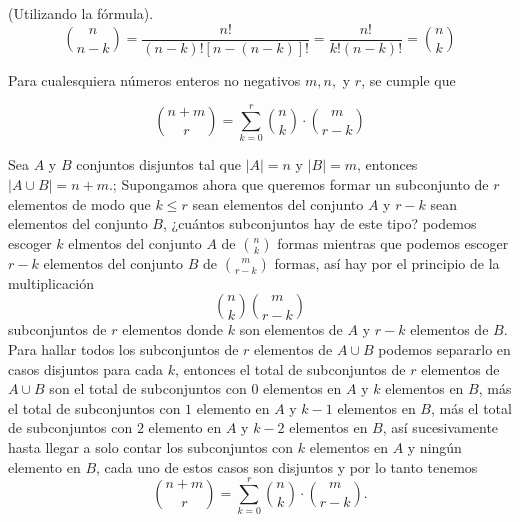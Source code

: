 \begin{demostracion}
(Utilizando la fórmula).
\[ \binom{n}{n-k} = \frac{n!}{(n-k)![n-(n-k)]!} = \frac{n!}{k!(n-k)!} = \binom{n}{k} \]
\end{demostracion}

\begin{teorema}
    Para cualesquiera números enteros no negativos \( m, n, \) y \( r \), se cumple que

\[ \binom{n+m}{r} = \sum_{k=0}^{r} \binom{n}{k} \cdot \binom{m}{r-k} \]
\end{teorema}

\begin{demostracion}

Sea $A$ y $B$ conjuntos disjuntos tal que $|A|=n$ y $|B|=m$, entonces $|A \cup B|=n+m$.; Supongamos ahora que queremos formar un subconjunto de $r$ elementos de modo que $k\leq r$ sean elementos del conjunto $A$ y $r-k$ sean elementos del conjunto $B$, ¿cuántos subconjuntos hay de este tipo? podemos escoger $k$ elmentos del conjunto $A$ de $\displaystyle\binom{n}{k}$ formas mientras que podemos escoger $r-k$ elementos del conjunto $B$ de $\displaystyle\binom{m}{r-k}$ formas, así hay por el principio de la multiplicación $$\binom{n}{k}\binom{m}{r-k}$$ subconjuntos de $r$ elementos donde $k$ son elementos de $A$ y $r-k$ elementos de $B$.  Para hallar todos los subconjuntos de $r$ elementos de $A\cup B$ podemos separarlo en casos disjuntos para cada $k$, entonces el total de subconjuntos de $r$ elementos de $A\cup B$ son el total de subconjuntos con $0$ elementos en $A$ y $k$ elementos en $B$, más el total de subconjuntos con $1$ elemento en $A$ y $k-1$ elementos en $B$, más el total de subconjuntos con $2$ elemento en $A$ y $k-2$ elementos en $B$, así sucesivamente hasta llegar a solo contar los subconjuntos con $k$ elementos en $A$ y ningún elemento en $B$, cada uno de estos casos son disjuntos y por lo tanto tenemos 
\[ \binom{n+m}{r} = \sum_{k=0}^{r} \binom{n}{k} \cdot \binom{m}{r-k}. \]



\end{demostracion}
